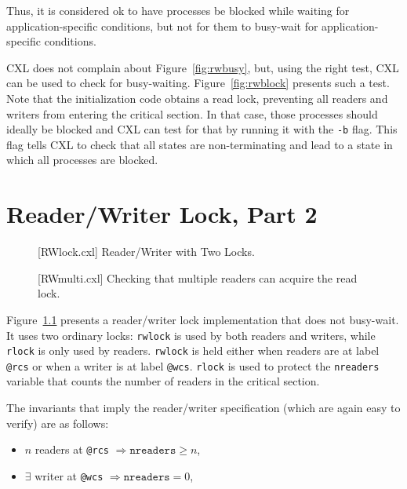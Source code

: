 \documentclass{report}
\newenvironment{code}{
\tcolorbox
}{
\endtcolorbox
}
\begin{document}
Thus, it is considered ok to have processes be blocked while waiting
for application-specific conditions, but not for them to
busy-wait for application-specific conditions.

CXL does not complain about Figure~\ref{fig:rwbusy}, but, using
the right test, CXL can be used to check for busy-waiting.
Figure~\ref{fig:rwblock} presents such a test.
Note that the initialization code obtains a read lock, preventing
all readers and writers from entering the critical section.
In that case, those processes should ideally be blocked and CXL
can test for that by running it with the \texttt{-b} flag.
This flag tells CXL to check
that all states are non-terminating and lead to a state in which
all processes are blocked.

\chapter{Reader/Writer Lock, Part 2}

\begin{figure}
\begin{code}
\end{code}
\caption{[RWlock.cxl] Reader/Writer with Two Locks.}
\label{fig:rw2lock}
\end{figure}

\begin{figure}
\begin{code}
\end{code}
\caption{[RWmulti.cxl] Checking that multiple readers can acquire the read lock.}
\label{fig:rwmulti}
\end{figure}

Figure~\ref{fig:rw2lock} presents a reader/writer lock implementation
that does not busy-wait.
It uses two ordinary locks: \texttt{rwlock} is used by both readers and writers,
while \texttt{rlock} is only used by readers.
\texttt{rwlock} is held either when readers are at label \texttt{@rcs}
or when a writer is at label \texttt{@wcs}.
\texttt{rlock} is used to protect the \texttt{nreaders} variable that
counts the number of readers in the critical section. 

The invariants that imply the reader/writer specification
(which are again easy to verify) are as follows:

\begin{itemize}
\item $n$ readers at \texttt{@rcs} $\Rightarrow \mathtt{nreaders} \ge n$,
\item $\exists$ writer at \texttt{@wcs} $\Rightarrow \mathtt{nreaders} = 0$,
\end{itemize}
\end{document}
